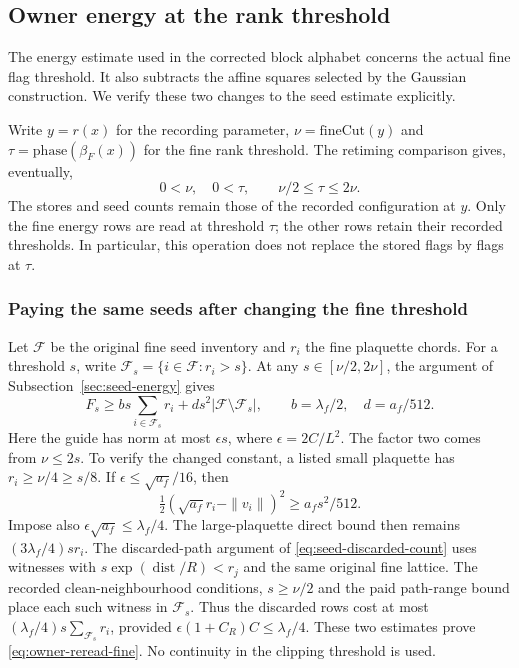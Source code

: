 \subsection{Owner energy at the rank threshold}
\label{sec:actual-harvested-owner-energy}

The energy estimate used in the corrected block alphabet concerns
the actual fine flag threshold. It also subtracts the affine squares
selected by the Gaussian construction. We verify these two changes
to the seed estimate explicitly.

Write $y=r(x)$ for the recording parameter,
$\nu=\mathrm{fineCut}(y)$ and
$\tau=\mathrm{phase}(\beta_F(x))$ for the fine rank threshold.
The retiming comparison gives, eventually,
\begin{equation}\label{eq:owner-threshold-band}
 0<\nu,\quad 0<\tau,\qquad \nu/2\le\tau\le2\nu.
\end{equation}
The stores and seed counts remain those of the recorded configuration
at $y$. Only the fine energy rows are read at threshold $\tau$;
the other rows retain their recorded thresholds. In particular,
this operation does not replace the stored flags by flags at $\tau$.

\subsubsection{Paying the same seeds after changing the fine threshold}

Let $\mathcal F$ be the original fine seed inventory and
$r_i$ the fine plaquette chords. For a threshold $s$, write
$\mathcal F_s=\{i\in\mathcal F:r_i>s\}$. At any
$s\in[\nu/2,2\nu]$, the argument of
Subsection~\ref{sec:seed-energy} gives
\begin{equation}\label{eq:owner-reread-fine}
 F_s\ge b s\sum_{i\in\mathcal F_s}r_i
            +d s^2|\mathcal F\setminus\mathcal F_s|,
 \qquad b=\lambda_f/2,\quad d=a_f/512.
\end{equation}
Here the guide has norm at most $\epsilon s$, where
$\epsilon=2C/L^2$. The factor two comes from
$\nu\le2s$. To verify the changed constant, a listed small
plaquette has $r_i\ge\nu/4\ge s/8$. If
$\epsilon\le\sqrt{a_f}/16$, then
\[
 \tfrac12(\sqrt{a_f}r_i-\|v_i\|)^2
       \ge a_fs^2/512.
\]
Impose also $\epsilon\sqrt{a_f}\le\lambda_f/4$.
The large-plaquette direct bound then remains
$(3\lambda_f/4)sr_i$. The discarded-path argument of
\eqref{eq:seed-discarded-count} uses witnesses with
$s\exp(\operatorname{dist}/R)<r_j$ and the same original
fine lattice. The recorded clean-neighbourhood conditions,
$s\ge\nu/2$ and the paid path-range bound place each such
witness in $\mathcal F_s$. Thus the discarded rows cost at most
$(\lambda_f/4)s\sum_{\mathcal F_s}r_i$, provided
$\epsilon(1+C_R)C\le\lambda_f/4$. These two estimates prove
\eqref{eq:owner-reread-fine}. No continuity in the clipping
threshold is used.


